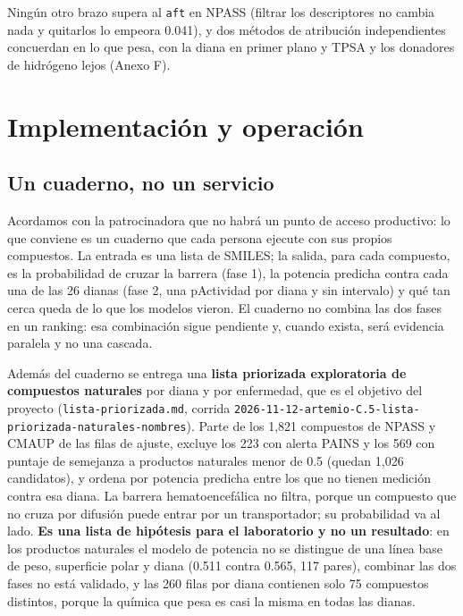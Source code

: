 \documentclass[letterpaper,11pt]{article}
\begin{document}
Ningún otro brazo supera al \texttt{aft} en NPASS (filtrar los descriptores no cambia nada y quitarlos lo empeora 0.041), y dos métodos de atribución independientes concuerdan en lo que pesa, con la diana en primer plano y TPSA y los donadores de hidrógeno lejos (Anexo F).

\section{Implementación y operación}
\subsection{Un cuaderno, no un servicio}

Acordamos con la patrocinadora que no habrá un punto de acceso productivo: lo que conviene es un cuaderno que cada persona ejecute con sus propios compuestos. La entrada es una lista de SMILES; la salida, para cada compuesto, es la probabilidad de cruzar la barrera (fase 1), la potencia predicha contra cada una de las 26 dianas (fase 2, una pActividad por diana y sin intervalo) y qué tan cerca queda de lo que los modelos vieron. El cuaderno no combina las dos fases en un ranking: esa combinación sigue pendiente y, cuando exista, será evidencia paralela y no una cascada.

Además del cuaderno se entrega una \textbf{lista priorizada exploratoria de compuestos naturales} por diana y por enfermedad, que es el objetivo del proyecto (\texttt{lista-priorizada.md}, corrida \texttt{2026-\allowbreak{}11-\allowbreak{}12-\allowbreak{}artemio-\allowbreak{}C.5-\allowbreak{}lista-\allowbreak{}priorizada-\allowbreak{}naturales-\allowbreak{}nombres}). Parte de los 1,821 compuestos de NPASS y CMAUP de las filas de ajuste, excluye los 223 con alerta PAINS y los 569 con puntaje de semejanza a productos naturales menor de 0.5 \autocite{ertl2008natural} (quedan 1,026 candidatos), y ordena por potencia predicha entre los que no tienen medición contra esa diana. La barrera hematoencefálica no filtra, porque un compuesto que no cruza por difusión puede entrar por un transportador; su probabilidad va al lado. \textbf{Es una lista de hipótesis para el laboratorio y no un resultado}: en los productos naturales el modelo de potencia no se distingue de una línea base de peso, superficie polar y diana (0.511 contra 0.565, 117 pares), combinar las dos fases no está validado, y las 260 filas por diana contienen solo 75 compuestos distintos, porque la química que pesa es casi la misma en todas las dianas.
\end{document}
